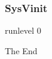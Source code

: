 \documentclass{beamer}
\begin{document}

\begin{frame}
	\frametitle{SysVinit}
\end{frame}



\begin{frame}
\Huge{\centerline{runlevel 0}}
\huge{\centerline{The End}}
\end{frame}

\end{document}
